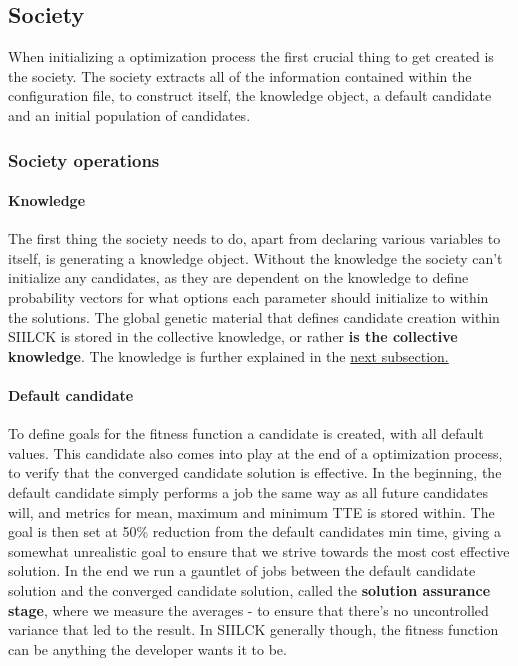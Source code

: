 \documentclass[a4paper,english]{report}
\begin{document}
		\subsection{Society}
		\label{sec:society}
		When initializing a optimization process the first crucial thing to get created is the society. The society extracts all of the information contained within the configuration file, to construct itself, the knowledge object, a default candidate and an initial population of candidates.
		\subsubsection{Society operations}
		\paragraph{Knowledge}
		The first thing the society needs to do, apart from declaring various variables to itself, is generating a knowledge object. Without the knowledge the society can't initialize any candidates, as they are dependent on the knowledge to define probability vectors for what options each parameter should initialize to within the solutions. The global genetic material that defines candidate creation within SIILCK is stored in the collective knowledge, or rather \textbf{is the collective knowledge}. The knowledge is further explained in the \hyperref[knowledge]{next subsection.} 
		\paragraph{Default candidate}
		To define goals for the fitness function a candidate is created, with all default values. This candidate also comes into play at the end of a optimization process, to verify that the converged candidate solution is effective. In the beginning, the default candidate simply performs a job the same way as all future candidates will, and metrics for mean, maximum and minimum TTE is stored within. The goal is then set at 50\% reduction from the default candidates min time, giving a somewhat unrealistic goal to ensure that we strive towards the most cost effective solution. In the end we run a gauntlet of jobs between the default candidate solution and the converged candidate solution, called the \textbf{solution assurance stage}, where we measure the averages - to ensure that there's no uncontrolled variance that led to the result. In SIILCK generally though, the fitness function can be anything the developer wants it to be.
\end{document}
